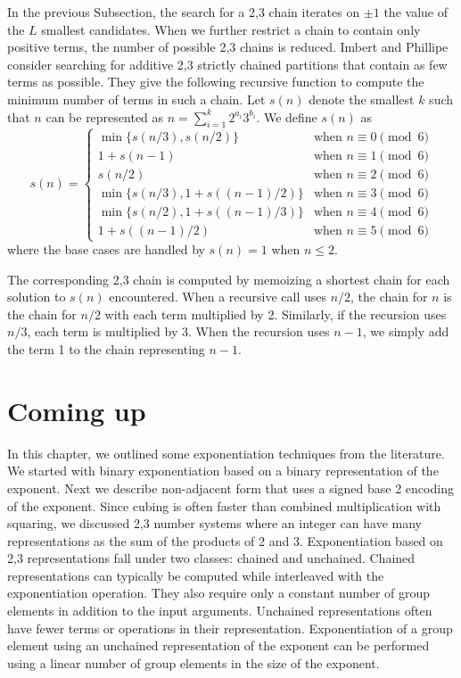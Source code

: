 \documentclass{ucalgthes1}
\theoremstyle{definition}
\begin{document}
In the previous Subsection, the search for a 2,3 chain iterates on $\pm 1$ the value of the $L$ smallest candidates.  When we further restrict a chain to contain only positive terms, the number of possible 2,3 chains is reduced.  Imbert and Phillipe \cite{Imbert2010b} consider searching for additive 2,3 strictly chained partitions that contain as few terms as possible.  They give the following recursive function to compute the minimum number of terms in such a chain. Let $s(n)$ denote the smallest $k$ such that $n$ can be represented as $n = \sum_{i=1}^k 2^{a_i} 3^{b_i}$. We define $s(n)$ as
\begin{equation*}
s(n) = \begin{cases}
	\min\{s(n/3), s(n/2)\} & \textrm{when } n \equiv 0 \pmod 6 \\
	1 + s(n-1) & \textrm{when } n \equiv 1 \pmod 6 \\
	s(n/2) & \textrm{when } n \equiv 2 \pmod 6 \\
	\min\{s(n/3), 1 + s((n-1)/2)\} & \textrm{when } n \equiv 3 \pmod 6 \\ 
	\min\{s(n/2), 1 + s((n-1)/3)\} & \textrm{when } n \equiv 4 \pmod 6 \\
	1 + s((n-1)/2) & \textrm{when } n \equiv 5 \pmod 6
\end{cases}
\end{equation*}
where the base cases are handled by $s(n) = 1$ when $n \le 2$.

The corresponding 2,3 chain is computed by memoizing a shortest chain for each solution to $s(n)$ encountered. When a recursive call uses $n/2$, the chain for $n$ is the chain for $n/2$ with each term multiplied by 2.  Similarly, if the recursion uses $n/3$, each term is multiplied by 3.  When the recursion uses $n-1$, we simply add the term 1 to the chain representing $n-1$.

\bigbreak
\section{Coming up}

In this chapter, we outlined some exponentiation techniques from the literature.  We started with binary exponentiation based on a binary representation of the exponent.  Next we describe non-adjacent form that uses a signed base 2 encoding of the exponent.  Since cubing is often faster than combined multiplication with squaring, we discussed 2,3 number systems where an integer can have many representations as the sum of the products of 2 and 3.  Exponentiation based on 2,3 representations fall under two classes: chained and unchained.  Chained representations can typically be computed while interleaved with the exponentiation operation.  They also require only a constant number of group elements in addition to the input arguments.  Unchained representations often have fewer terms or operations in their representation.  Exponentiation of a group element using an unchained representation of the exponent can be performed using a linear number of group elements in the size of the exponent.
\end{document}
